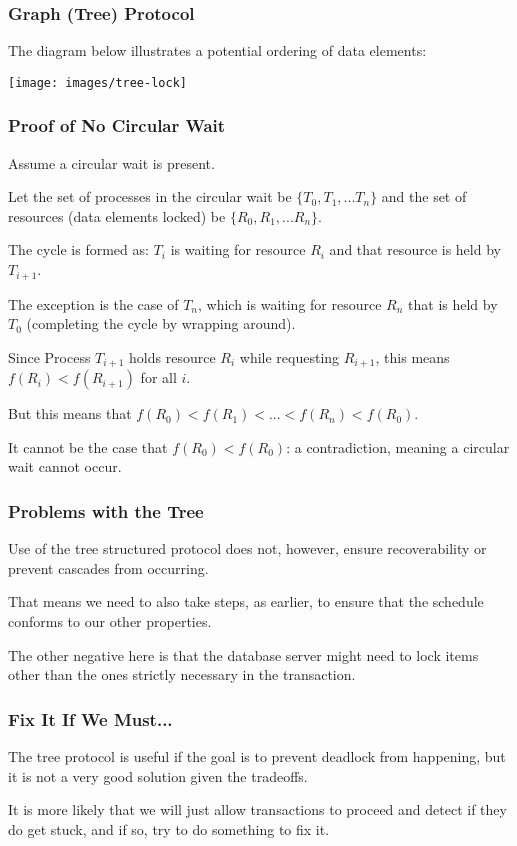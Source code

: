 \begin{frame}
\frametitle{Graph (Tree) Protocol}

The diagram below illustrates a potential ordering of data elements:

\begin{center}
\texttt{[image: images/tree-lock]}
\end{center}

\end{frame}


\begin{frame}
\frametitle{Proof of No Circular Wait}

Assume a circular wait is present. 

Let the set of processes in the circular wait be $\{T_{0}, T_{1}, ... T_{n}\}$ and the set of resources (data elements locked) be $\{R_{0}, R_{1}, ... R_{n}\}$. 

The cycle is formed as: $T_{i}$ is waiting for resource $R_{i}$ and that resource is held by $T_{i+1}$. 

The exception is the case of $T_{n}$, which is waiting for resource $R_{n}$ that is held by $T_{0}$ (completing the cycle by wrapping around). 

Since Process $T_{i+1}$ holds resource $R_{i}$ while requesting $R_{i+1}$, this means $f(R_{i}) < f(R_{i+1})$ for all $i$. 

But this means that $f(R_{0}) < f(R_{1}) < ... < f(R_{n}) < f(R_{0})$. 

It cannot be the case that $f(R_{0}) < f(R_{0})$: a contradiction, meaning a circular wait cannot occur.


\end{frame}

\begin{frame}
\frametitle{Problems with the Tree}

Use of the tree structured protocol does not, however, ensure recoverability or prevent cascades from occurring. 

That means we need to also take steps, as earlier, to ensure that the schedule conforms to our other properties. 

The other negative here is that the database server might need to lock items other than the ones strictly necessary in the transaction.


\end{frame}

\begin{frame}
\frametitle{Fix It If We Must...}

The tree protocol is useful if the goal is to prevent deadlock from happening, but it is not a very good solution given the tradeoffs.

It is more likely that we will just allow transactions to proceed and detect if they do get stuck, and if so, try to do something to fix it.



\end{frame}




